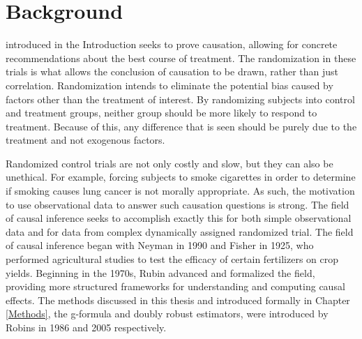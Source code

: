 
\chapter{Background} \label{background}

 introduced in the Introduction seeks to prove causation, allowing for concrete recommendations about the best course of treatment.  The randomization in these trials is what allows the conclusion of causation to be drawn, rather than just correlation.  Randomization intends to eliminate the potential bias caused by factors other than the treatment of interest.  By randomizing subjects into control and treatment groups, neither group should be more likely to respond to treatment.  Because of this, any difference that is seen should be purely due to the treatment and not exogenous factors.  

Randomized control trials are not only costly and slow, but they can also be unethical.  For example, forcing subjects to smoke cigarettes in order to determine if smoking causes lung cancer is not morally appropriate.  As such, the motivation to use observational data to answer such causation questions is strong.  The field of causal inference seeks to accomplish exactly this for both simple observational data and for data from complex dynamically assigned randomized trial.  The field of causal inference began with Neyman in 1990 and Fisher in 1925, who performed agricultural studies to test the efficacy of certain fertilizers on crop yields.\cite{edwards2005ra, fisher1935design, splawa1990application}  Beginning in the 1970s, Rubin advanced and formalized the field, providing more structured frameworks for understanding and computing causal effects.\cite{rosenbaum1984reducing, rubin1974estimating, rubin1978bayesian, rubin1984william} The methods discussed in this thesis and introduced formally in Chapter \ref{Methods}, the g-formula and doubly robust estimators, were introduced by Robins in 1986 and 2005 respectively.\cite{bang2005doubly, robins1986new}


